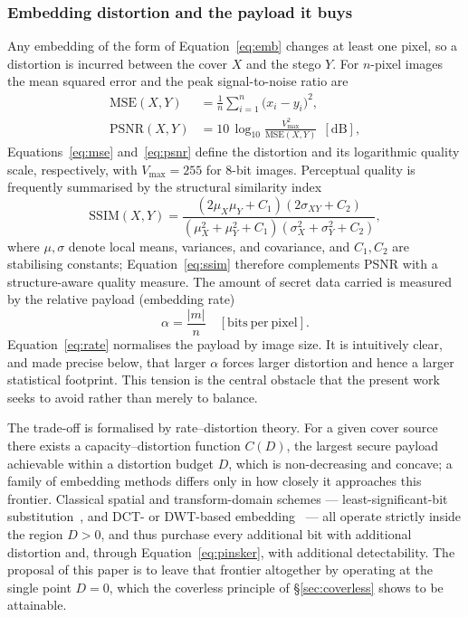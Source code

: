 \documentclass[10pt,a4paper]{article}
\theoremstyle{definition}
\begin{document}
\subsubsection{Embedding distortion and the payload it buys}\label{sec:distortion}
Any embedding of the form of Equation~\eqref{eq:emb} changes at least one pixel, so a
distortion is incurred between the cover $X$ and the stego $Y$. For $n$-pixel
images the mean squared error and the peak signal-to-noise ratio are
\begin{align}
  \mathrm{MSE}(X,Y) &= \frac{1}{n}\sum_{i=1}^{n}\bigl(x_i-y_i\bigr)^2,
  \label{eq:mse}\\
  \mathrm{PSNR}(X,Y) &= 10\,\log_{10}\!\frac{V_{\max}^2}{\mathrm{MSE}(X,Y)}\ \ [\mathrm{dB}],
  \label{eq:psnr}
\end{align}
Equations~\eqref{eq:mse} and~\eqref{eq:psnr} define the distortion and its
logarithmic quality scale, respectively, with $V_{\max}=255$ for 8-bit images.
Perceptual quality is frequently summarised
by the structural similarity index
\begin{equation}
  \mathrm{SSIM}(X,Y)=\frac{(2\mu_X\mu_Y+C_1)(2\sigma_{XY}+C_2)}
       {(\mu_X^2+\mu_Y^2+C_1)(\sigma_X^2+\sigma_Y^2+C_2)},
  \label{eq:ssim}
\end{equation}
where $\mu,\sigma$ denote local means, variances, and covariance, and $C_1,C_2$ are
stabilising constants; Equation~\eqref{eq:ssim} therefore complements PSNR with a
structure-aware quality measure. The amount of secret data carried is measured by the
relative payload (embedding rate)
\begin{equation}
  \alpha=\frac{|m|}{n}\quad[\mathrm{bits\ per\ pixel}].
  \label{eq:rate}
\end{equation}
Equation~\eqref{eq:rate} normalises the payload by image size. It is intuitively
clear, and made precise below, that larger $\alpha$ forces larger
distortion and hence a larger statistical footprint. This tension is the central
obstacle that the present work seeks to avoid rather than merely to balance.

The trade-off is formalised by rate--distortion theory. For a given cover source
there exists a capacity--distortion function $C(D)$, the largest secure payload
achievable within a distortion budget $D$, which is non-decreasing and concave; a
family of embedding methods differs only in how closely it approaches this frontier.
Classical spatial and transform-domain schemes --- least-significant-bit
substitution~\cite{chan2004}, and DCT- or DWT-based embedding~\cite{westfeld2001f5} --- all operate strictly inside the
region $D>0$, and thus purchase every additional bit with additional distortion and,
through Equation~\eqref{eq:pinsker}, with additional detectability. The proposal of this paper
is to leave that frontier altogether by operating at the single point $D=0$, which
the coverless principle of \S\ref{sec:coverless} shows to be attainable.
\end{document}

